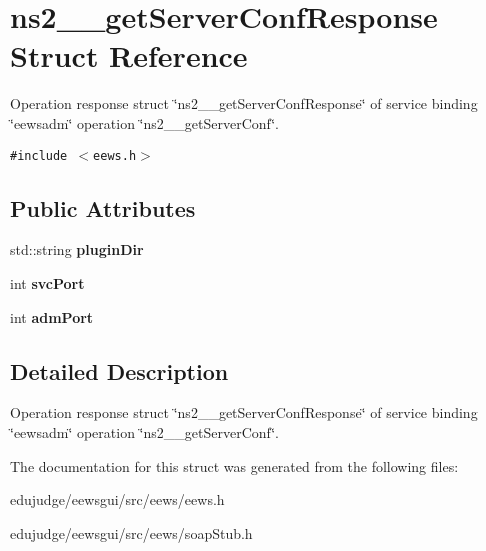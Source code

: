 \section{ns2\_\-\_\-getServerConfResponse Struct Reference}
\label{structns2____getServerConfResponse}
Operation response struct \char`\"{}ns2\_\-\_\-getServerConfResponse\char`\"{} of service binding \char`\"{}eewsadm\char`\"{} operation \char`\"{}ns2\_\-\_\-getServerConf\char`\"{}.  


{\tt \#include $<$eews.h$>$}

\subsection*{Public Attributes}
\begin{CompactItemize}
\item 
std::string \textbf{pluginDir}\label{structns2____getServerConfResponse_0d9b4882d2b0a18e6003e92a6f4dcebd}

\item 
int \textbf{svcPort}\label{structns2____getServerConfResponse_0d31adc22bb004da6c9bad1afcd61548}

\item 
int \textbf{admPort}\label{structns2____getServerConfResponse_ef0eae49764b48fb2c90268be6236afe}

\end{CompactItemize}


\subsection{Detailed Description}
Operation response struct \char`\"{}ns2\_\-\_\-getServerConfResponse\char`\"{} of service binding \char`\"{}eewsadm\char`\"{} operation \char`\"{}ns2\_\-\_\-getServerConf\char`\"{}. 

The documentation for this struct was generated from the following files:\begin{CompactItemize}
\item 
edujudge/eewsgui/src/eews/eews.h\item 
edujudge/eewsgui/src/eews/soapStub.h\end{CompactItemize}
